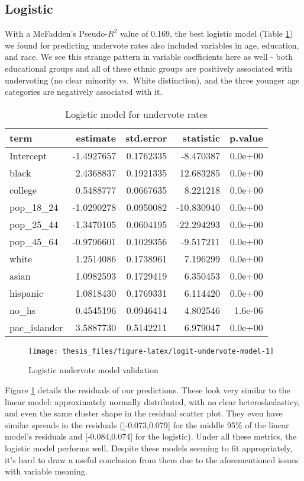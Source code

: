 \documentclass[12pt,twoside]{reedthesis}
\begin{document}
\hypertarget{logistic-2}{%
\subsection{Logistic}\label{logistic-2}}

With a McFadden's Pseudo-\(R^2\) value of 0.169, the best logistic model (Table \ref{tab:logit-undervote-model}) we found for predicting undervote rates also included variables in age, education, and race. We see this strange pattern in variable coefficients here as well - both educational groups and all of these ethnic groups are positively associated with undervoting (no clear minority vs.~White distinction), and the three younger age categories are negatively associated with it.
\begin{table}[t]

\caption[Logit undervote model]{\label{tab:logit-undervote-model}Logistic model for undervote rates}
\centering
\begin{tabular}{lrrrr}
\toprule
term & estimate & std.error & statistic & p.value\\
\midrule
Intercept & -1.4927657 & 0.1762335 & -8.470387 & 0.0e+00\\
black & 2.4368837 & 0.1921335 & 12.683285 & 0.0e+00\\
college & 0.5488777 & 0.0667635 & 8.221218 & 0.0e+00\\
pop\_18\_24 & -1.0290278 & 0.0950082 & -10.830940 & 0.0e+00\\
pop\_25\_44 & -1.3470105 & 0.0604195 & -22.294293 & 0.0e+00\\
\addlinespace
pop\_45\_64 & -0.9796601 & 0.1029356 & -9.517211 & 0.0e+00\\
white & 1.2514086 & 0.1738961 & 7.196299 & 0.0e+00\\
asian & 1.0982593 & 0.1729419 & 6.350453 & 0.0e+00\\
hispanic & 1.0818430 & 0.1769331 & 6.114420 & 0.0e+00\\
no\_hs & 0.4545196 & 0.0946414 & 4.802546 & 1.6e-06\\
\addlinespace
pac\_islander & 3.5887730 & 0.5142211 & 6.979047 & 0.0e+00\\
\bottomrule
\end{tabular}
\end{table}
\begin{figure}
\texttt{[image: thesis\_files/figure-latex/logit-undervote-model-1]} \caption{Logistic undervote model validation}\label{fig:logit-undervote-model}
\end{figure}
Figure \ref{fig:logit-undervote-model} details the residuals of our predictions. These look very similar to the linear model: approximately normally distributed, with no clear heteroskedasticy, and even the same cluster shape in the residual scatter plot. They even have similar spreads in the residuals ({[}-0.073,0.079{]} for the middle 95\% of the linear model's residuals and {[}-0.084,0.074{]} for the logistic). Under all these metrics, the logistic model performs well. Despite these models seeming to fit appropriately, it's hard to draw a useful conclusion from them due to the aforementioned issues with variable meaning.
\end{document}
